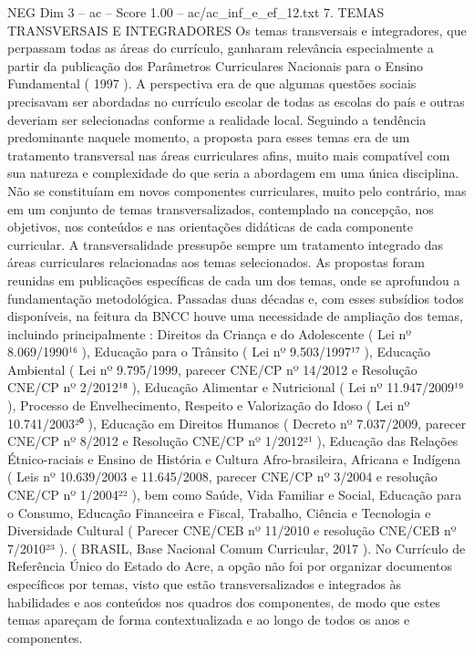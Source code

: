 \begin{textsample}{NEG Dim 3 – ac – Score 1.00 – ac/ac\_inf\_e\_ef\_12.txt}  \label{ex:f3_neg_265}
7.
TEMAS TRANSVERSAIS E INTEGRADORES Os temas transversais e integradores, que perpassam todas as áreas do currículo, ganharam relevância especialmente a partir da publicação dos Parâmetros Curriculares Nacionais para o Ensino Fundamental ( 1997 ).
A perspectiva era de que algumas questões sociais precisavam ser abordadas no currículo escolar de todas as escolas do país e outras deveriam ser selecionadas conforme a realidade local.
Seguindo a tendência predominante naquele momento, a proposta para esses temas era de um tratamento transversal nas áreas curriculares afins, muito mais compatível com sua natureza e complexidade do que seria a abordagem em uma única disciplina.
Não se constituíam em novos componentes curriculares, muito pelo contrário, mas em um conjunto de temas transversalizados, contemplado na concepção, nos objetivos, nos conteúdos e nas orientações didáticas de cada componente curricular.
A transversalidade pressupõe sempre um tratamento integrado das áreas curriculares relacionadas aos temas selecionados.
As propostas foram reunidas em publicações específicas de cada um dos temas, onde se aprofundou a fundamentação metodológica.
Passadas duas décadas e, com esses subsídios todos disponíveis, na feitura da BNCC houve uma necessidade de ampliação dos temas, incluindo principalmente : Direitos da Criança e do Adolescente ( Lei nº 8.069/1990¹⁶ ), Educação para o Trânsito ( Lei nº 9.503/1997¹⁷ ), Educação Ambiental ( Lei nº 9.795/1999, parecer CNE/CP nº 14/2012 e Resolução CNE/CP nº 2/2012¹⁸ ), Educação Alimentar e Nutricional ( Lei nº 11.947/2009¹⁹ ), Processo de Envelhecimento, Respeito e Valorização do Idoso ( Lei nº 10.741/2003²⁰ ), Educação em Direitos Humanos ( Decreto nº 7.037/2009, parecer CNE/CP nº 8/2012 e Resolução CNE/CP nº 1/2012²¹ ), Educação das Relações Étnico-raciais e Ensino de História e Cultura Afro-brasileira, Africana e Indígena ( Leis nº 10.639/2003 e 11.645/2008, parecer CNE/CP nº 3/2004 e resolução CNE/CP nº 1/2004²² ), bem como Saúde, Vida Familiar e Social, Educação para o Consumo, Educação Financeira e Fiscal, Trabalho, Ciência e Tecnologia e Diversidade Cultural ( Parecer CNE/CEB nº 11/2010 e resolução CNE/CEB nº 7/2010²³ ). ( BRASIL, Base Nacional Comum Curricular, 2017 ).
No Currículo de Referência Único do Estado do Acre, a opção não foi por organizar documentos específicos por temas, visto que estão transversalizados e integrados às habilidades e aos conteúdos nos quadros dos componentes, de modo que estes temas apareçam de forma contextualizada e ao longo de todos os anos e componentes.

\end{textsample}
